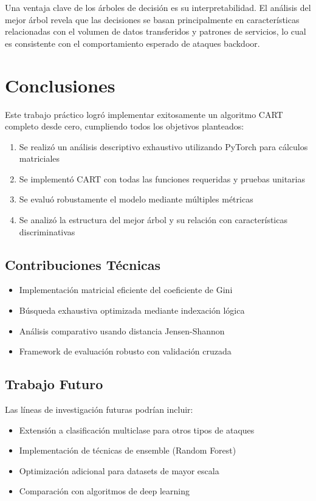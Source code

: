 \documentclass[12pt,a4paper]{article}
\begin{document}
Una ventaja clave de los árboles de decisión es su interpretabilidad. El análisis del mejor árbol revela que las decisiones se basan principalmente en características relacionadas con el volumen de datos transferidos y patrones de servicios, lo cual es consistente con el comportamiento esperado de ataques backdoor.

\section{Conclusiones}

Este trabajo práctico logró implementar exitosamente un algoritmo CART completo desde cero, cumpliendo todos los objetivos planteados:

\begin{enumerate}
    \item Se realizó un análisis descriptivo exhaustivo utilizando PyTorch para cálculos matriciales
    \item Se implementó CART con todas las funciones requeridas y pruebas unitarias
    \item Se evaluó robustamente el modelo mediante múltiples métricas
    \item Se analizó la estructura del mejor árbol y su relación con características discriminativas
\end{enumerate}

\subsection{Contribuciones Técnicas}

\begin{itemize}
    \item Implementación matricial eficiente del coeficiente de Gini
    \item Búsqueda exhaustiva optimizada mediante indexación lógica  
    \item Análisis comparativo usando distancia Jensen-Shannon
    \item Framework de evaluación robusto con validación cruzada
\end{itemize}

\subsection{Trabajo Futuro}

Las líneas de investigación futuras podrían incluir:
\begin{itemize}
    \item Extensión a clasificación multiclase para otros tipos de ataques
    \item Implementación de técnicas de ensemble (Random Forest)
    \item Optimización adicional para datasets de mayor escala
    \item Comparación con algoritmos de deep learning
\end{itemize}
\end{document}
